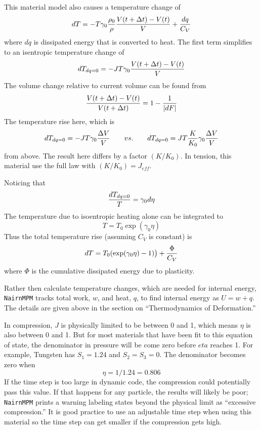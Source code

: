\documentclass[11pt]{book}
\def\Jeff{J_{eff}}
\begin{document}
This material model also causes a temperature change of
\begin{equation}
     dT = - T \gamma_0 {\rho_0\over \rho} {V(t+\Delta t)-V(t)\over V} + {dq \over C_V}
\end{equation}
where $dq$ is dissipated energy that is converted to heat. The first term simplifies to an isentropic temperature change of
\begin{equation}
     dT_{dq=0} = - JT \gamma_0  {V(t+\Delta t)-V(t)\over V} 
\end{equation}
The volume change relative to current volume can be found from
\begin{equation}
     {V(t+\Delta t)-V(t)\over V(t+\Delta t)} =1 - {1\over |dF|}
\end{equation}
The temperature rise here, which is
\begin{equation}
     dT_{dq=0} = - J T\gamma_0 {\Delta V\over V}    \qquad vs. \qquad  dT_{dq=0} = JT  {K\over K_0} \gamma_0 {\Delta V\over V}     \label{mgdt}
\end{equation}
from above. The result here differs by a factor $(K/K_0)$. In tension, this material use the full law with $(K/K_0) = \Jeff$.

Noticing that
\begin{equation}
     {dT_{dq=0}\over T} =   \gamma_0  d\eta
\end{equation}
The temperature due to isoentropic heating alone can be integrated to
\begin{equation}
     T = T_0\exp( \gamma_0  \eta)
\end{equation}
Thus the total temperature rise (assuming $C_V$ is constant) is
\begin{equation}
      dT = T_0(\exp( \gamma_0  \eta)-1)\bigr) + {\Phi\over C_V}
\end{equation}
where $\Phi$ is the cumulative dissipated energy due to plasticity.

Rather then calculate temperature changes, which are needed for internal energy, {\tt NairnMPM} tracks total work, $w$, and heat, $q$, to find internal energy as $U = w+q$. The details are given above in the section on ``Thermodynamics of Deformation.''

In compression, $J$ is physically limited to be between 0 and 1, which means $\eta$ is also between 0 and 1. But for most materials that have been fit to this equation of state, the denominator in pressure will be come zero before $eta$ reaches 1. For example, Tungsten has $S_1=1.24$ and $S_2=S_3=0$. The denominator becomes zero when
\begin{equation}
     \eta = 1/1.24 = 0.806
\end{equation}
If the time step is too large in dynamic code, the compression could potentially pass this value. If that happens for any particle, the results will likely be poor; {\tt NairnMPM} prints a warning labeling states beyond the physical limit as ``excessive compression.'' It is good practice to use an adjustable time step when using this material so the time step can get smaller if the compression gets high.
\end{document}
